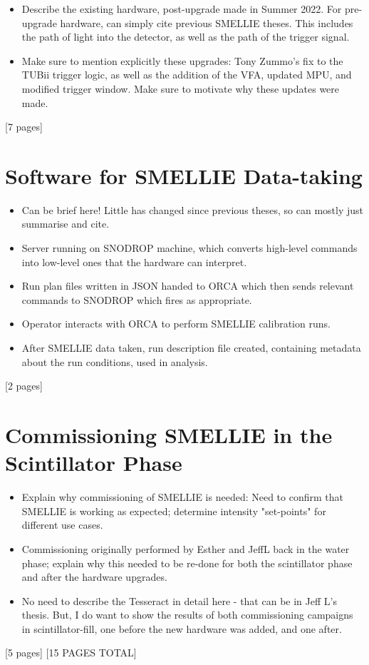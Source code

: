 {
\color{blue}
\begin{itemize}
    \item Describe the existing hardware, post-upgrade made in Summer 2022. For pre-upgrade hardware, can simply cite previous SMELLIE theses. This includes the path of light into the detector, as well as the path of the trigger signal.
    \item Make sure to mention explicitly these upgrades: Tony Zummo's fix to the TUBii trigger logic, as well as the addition of the VFA, updated MPU, and modified trigger window. Make sure to motivate why these updates were made.
\end{itemize}
[7 pages]
\section{Software for SMELLIE Data-taking}
\begin{itemize}
    \item Can be brief here! Little has changed since previous theses, so can mostly just summarise and cite.
    \item Server running on SNODROP machine, which converts high-level commands into low-level ones that the hardware can interpret.
    \item Run plan files written in JSON handed to ORCA which then sends relevant commands to SNODROP which fires as appropriate.
    \item Operator interacts with ORCA to perform SMELLIE calibration runs.
    \item After SMELLIE data taken, run description file created, containing metadata about the run conditions, used in analysis.
\end{itemize}
[2 pages]
\section[Commissioning SMELLIE in the Scintillator Phase]{Commissioning SMELLIE in the\\ Scintillator Phase}
\begin{itemize}
    \item Explain why commissioning of SMELLIE is needed: Need to confirm that SMELLIE is working as expected; determine intensity "set-points" for different use cases.
    \item Commissioning originally performed by Esther and JeffL back in the water phase; explain why this needed to be re-done for both the scintillator phase and after the hardware upgrades.
    \item No need to describe the Tesseract in detail here - that can be in Jeff L's thesis. But, I do want to show the results of both commissioning campaigns in scintillator-fill, one before the new hardware was added, and one after.
\end{itemize}
[5 pages]
[15 PAGES TOTAL]
}